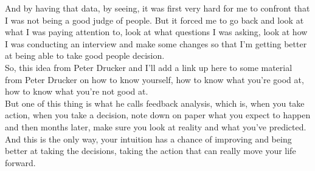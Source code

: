 \documentclass[a4paper,12pt]{article}
\begin{document}
And by having that data, by seeing, it was first very hard for me to confront that I was not being a good judge of people. But it forced me to go back and look at what I was paying attention to, look at what questions I was asking, look at how I was conducting an interview and make some changes so that I'm getting better at being able to take good people decision. \\

So, this idea from Peter Drucker and I'll add a link up here to some material from Peter Drucker on how to know yourself, how to know what you're good at, how to know what you're not good at. \\

But one of this thing is what he calls feedback analysis, which is, when you take action, when you take a decision, note down on paper what you expect to happen and then months later, make sure you look at reality and what you've predicted. \\

And this is the only way, your intuition has a chance of improving and being better at taking the decisions, taking the action that can really move your life forward. \\
\end{document}
